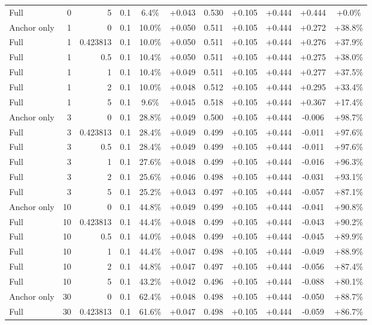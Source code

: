 \begin{table}[htbp]
\begin{tabular}{lrrrccccccc}
Full & 0 & 5 & 0.1 & 6.4\% & +0.043 & 0.530 & +0.105 & +0.444 & +0.444 & +0.0\% \\
Anchor only & 1 & 0 & 0.1 & 10.0\% & +0.050 & 0.511 & +0.105 & +0.444 & +0.272 & +38.8\% \\
Full & 1 & 0.423813 & 0.1 & 10.0\% & +0.050 & 0.511 & +0.105 & +0.444 & +0.276 & +37.9\% \\
Full & 1 & 0.5 & 0.1 & 10.4\% & +0.050 & 0.511 & +0.105 & +0.444 & +0.275 & +38.0\% \\
Full & 1 & 1 & 0.1 & 10.4\% & +0.049 & 0.511 & +0.105 & +0.444 & +0.277 & +37.5\% \\
Full & 1 & 2 & 0.1 & 10.0\% & +0.048 & 0.512 & +0.105 & +0.444 & +0.295 & +33.4\% \\
Full & 1 & 5 & 0.1 & 9.6\% & +0.045 & 0.518 & +0.105 & +0.444 & +0.367 & +17.4\% \\
Anchor only & 3 & 0 & 0.1 & 28.8\% & +0.049 & 0.500 & +0.105 & +0.444 & -0.006 & +98.7\% \\
Full & 3 & 0.423813 & 0.1 & 28.4\% & +0.049 & 0.499 & +0.105 & +0.444 & -0.011 & +97.6\% \\
Full & 3 & 0.5 & 0.1 & 28.4\% & +0.049 & 0.499 & +0.105 & +0.444 & -0.011 & +97.6\% \\
Full & 3 & 1 & 0.1 & 27.6\% & +0.048 & 0.499 & +0.105 & +0.444 & -0.016 & +96.3\% \\
Full & 3 & 2 & 0.1 & 25.6\% & +0.046 & 0.498 & +0.105 & +0.444 & -0.031 & +93.1\% \\
Full & 3 & 5 & 0.1 & 25.2\% & +0.043 & 0.497 & +0.105 & +0.444 & -0.057 & +87.1\% \\
Anchor only & 10 & 0 & 0.1 & 44.8\% & +0.049 & 0.499 & +0.105 & +0.444 & -0.041 & +90.8\% \\
Full & 10 & 0.423813 & 0.1 & 44.4\% & +0.048 & 0.499 & +0.105 & +0.444 & -0.043 & +90.2\% \\
Full & 10 & 0.5 & 0.1 & 44.0\% & +0.048 & 0.499 & +0.105 & +0.444 & -0.045 & +89.9\% \\
Full & 10 & 1 & 0.1 & 44.4\% & +0.047 & 0.498 & +0.105 & +0.444 & -0.049 & +88.9\% \\
Full & 10 & 2 & 0.1 & 44.8\% & +0.047 & 0.497 & +0.105 & +0.444 & -0.056 & +87.4\% \\
Full & 10 & 5 & 0.1 & 43.2\% & +0.042 & 0.496 & +0.105 & +0.444 & -0.088 & +80.1\% \\
Anchor only & 30 & 0 & 0.1 & 62.4\% & +0.048 & 0.498 & +0.105 & +0.444 & -0.050 & +88.7\% \\
Full & 30 & 0.423813 & 0.1 & 61.6\% & +0.047 & 0.498 & +0.105 & +0.444 & -0.059 & +86.7\% \\

\end{tabular}
\end{table}
